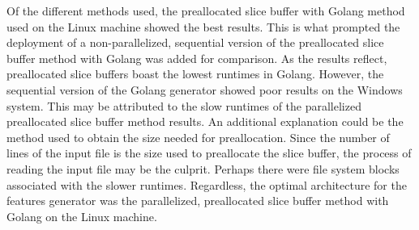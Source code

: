 Of the different methods used, the preallocated slice buffer with Golang method used on the Linux machine showed the best results. This is what prompted the deployment of a non-parallelized, sequential version of the preallocated slice buffer method with Golang was added for comparison. As the results reflect, preallocated slice buffers boast the lowest runtimes in Golang. However, the sequential version of the Golang generator showed poor results on the Windows system. This may be attributed to the slow runtimes of the parallelized preallocated slice buffer method results. An additional explanation could be the method used to obtain the size needed for preallocation. Since the number of lines of the input file is the size used to preallocate the slice buffer, the process of reading the input file may be the culprit. Perhaps there were file system blocks associated with the slower runtimes. Regardless, the optimal architecture for the features generator was the parallelized, preallocated slice buffer method with Golang on the Linux machine.
